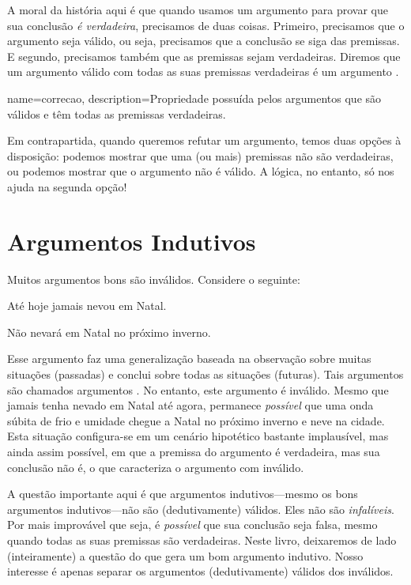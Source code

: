 A moral da história aqui é que quando usamos um argumento para provar que sua conclusão \emph{é verdadeira}, precisamos de duas coisas.
Primeiro, precisamos que o argumento seja válido, ou seja, precisamos que a conclusão se siga das premissas.
E segundo, precisamos também que as premissas sejam verdadeiras.
Diremos que um argumento válido com todas as suas premissas verdadeiras é um argumento .


{
name=correcao,
description={Propriedade possuída pelos argumentos que são válidos e têm todas as premissas verdadeiras.}
}

Em contrapartida, quando queremos refutar um argumento, temos duas opções à disposição: podemos mostrar que uma (ou mais) premissas não são verdadeiras, ou podemos mostrar que o argumento não é válido.
A lógica, no entanto, só nos ajuda na segunda opção!


\section{Argumentos Indutivos}

Muitos argumentos bons são inválidos. Considere o seguinte:
	\begin{earg}
		\item[] Até hoje jamais nevou em Natal.
	\item[\therefore] Não nevará em Natal no próximo inverno.
\end{earg}
Esse argumento faz uma generalização baseada na observação sobre muitas situações (passadas) e conclui sobre todas as situações (futuras).
Tais argumentos são chamados argumentos .
No entanto, este argumento é inválido.
Mesmo que jamais tenha nevado em Natal até agora, permanece \emph{possível} que 
uma onda súbita de frio e umidade chegue a Natal no próximo inverno e neve na cidade.
Esta situação configura-se em um cenário hipotético bastante implausível, mas ainda assim possível, em que a premissa do argumento é verdadeira, mas sua conclusão não é, o que caracteriza o argumento com inválido.

A questão importante aqui é que argumentos indutivos---mesmo os bons argumentos indutivos---não são (dedutivamente) válidos.
Eles não são \emph{infalíveis}.
Por mais improvável que seja, é \emph{possível} que sua conclusão seja falsa, mesmo quando todas as suas premissas são verdadeiras.
Neste livro, deixaremos de lado (inteiramente) a questão do que gera um bom argumento indutivo.
Nosso interesse é apenas separar os argumentos (dedutivamente) válidos dos inválidos.

